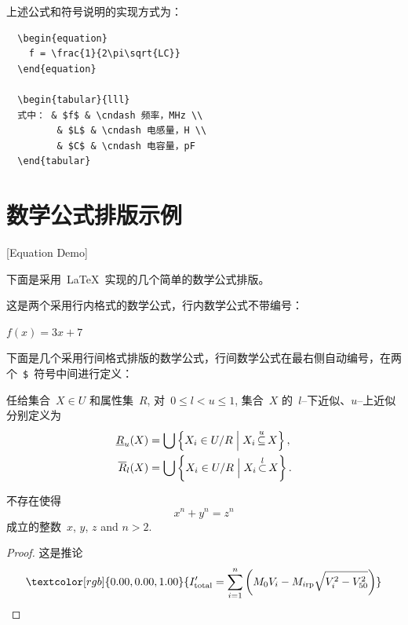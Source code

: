 上述公式和符号说明的实现方式为：

\begin{lstlisting}
  \begin{equation}
    f = \frac{1}{2\pi\sqrt{LC}}
  \end{equation}

  \begin{tabular}{lll}
  式中： & $f$ & \cndash 频率，MHz \\
         & $L$ & \cndash 电感量，H \\
         & $C$ & \cndash 电容量，pF 
  \end{tabular}
\end{lstlisting}

\section{数学公式排版示例}[Equation Demo]

下面是采用~\LaTeX~实现的几个简单的数学公式排版。

这是两个采用行内格式的数学公式，行内数学公式不带编号：

$f(x) = 3x + 7$

下面是几个采用行间格式排版的数学公式，行间数学公式在最右侧自动编号，在两个~\verb|$|~符号中间进行定义：

\begin{definition}
  任给集合~$X \in U$ 和属性集~$R$, 对~$0\leqslant l < u \leqslant 1$,
  集合~$X$ 的~$l${--}下近似、$u${--}上近似分别定义为
  \begin{align}
    \underline {R} _u (X) & =  \bigcup \left\{ {X_i  \in U/R\Bigm|X_i \mathop  \subseteq \limits^u  X} \right\}, \\
    \overline {R} _l (X)  & =  \bigcup \left\{ {X_i  \in U/R\Bigm|X_i \mathop  \subset \limits^l X} \right\}.
  \end{align}
\end{definition}

\begin{theorem}[\heiti 费马]
  {\upshape\kaishu 不存在使得~
    \begin{equation}
      x^n+y^n=z^n
    \end{equation}
    成立的整数~$x$, $y$, $z$ and $n>2$. }
\end{theorem}

\begin{proof}
  {\upshape\kaishu 这是推论
    \begin{equation}
      \textcolor[rgb]{0.00,0.00,1.00}{
      I'_{{\rm{total}}} = \sum\limits_{i = 1}^n
      {\left( {M_0 V_i - M_{i{\rm{rp}}} \sqrt{V_i^2 - V_{50}^2}}\right)}}
    \end{equation}}
\end{proof}

